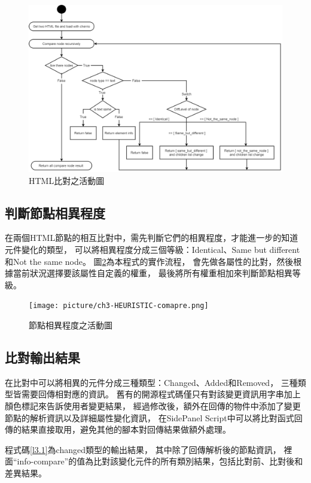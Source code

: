 \begin{figure}[H]
    \centering
    \includegraphics[width=1.0\textwidth]{picture/ch3-activity diagram.png}
    \caption{HTML比對之活動圖}
    \label{f3.5}
\end{figure}

\subsection{判斷節點相異程度}\label{s3.3.1}
在兩個HTML節點的相互比對中，需先判斷它們的相異程度，才能進一步的知道元件變化的類型，
可以將相異程度分成三個等級：Identical、Same but different和Not the same node。
圖\ref{f3.6}為本程式的實作流程，
會先做各屬性的比對，然後根據當前狀況選擇要該屬性自定義的權重，
最後將所有權重相加來判斷節點相異等級。

\begin{figure}[H]
    \centering
    \texttt{[image: picture/ch3-HEURISTIC-comapre.png]}
    \caption{節點相異程度之活動圖}
    \label{f3.6}
\end{figure}

\subsection{比對輸出結果}\label{s3.3.2}
在比對中可以將相異的元件分成三種類型：Changed、Added和Removed，
三種類型皆需要回傳相對應的資訊。
舊有的開源程式碼僅只有對該變更資訊用字串加上顏色標記來告訴使用者變更結果，
經過修改後，額外在回傳的物件中添加了變更節點的解析資訊以及詳細屬性變化資訊，
在SidePanel Script中可以將比對函式回傳的結果直接取用，避免其他的腳本對回傳結果做額外處理。

程式碼\ref{l3.1}為changed類型的輸出結果，
其中除了回傳解析後的節點資訊，
裡面``info-compare''的值為比對該變化元件的所有類別結果，包括比對前、比對後和差異結果。

